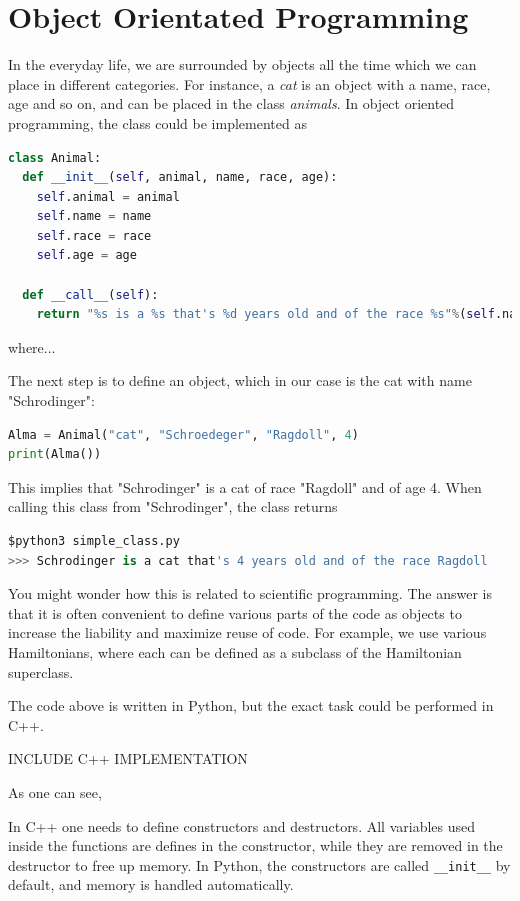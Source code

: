 \section{Object Orientated Programming}
In the everyday life, we are surrounded by objects all the time which we can place in different categories. For instance, a \textit{cat} is an object with a name, race, age and so on, and can be placed in the class \textit{animals}. In object oriented programming, the class could be implemented as

\lstset{basicstyle=\scriptsize}
\begin{lstlisting}[language=python]
class Animal:
  def __init__(self, animal, name, race, age):
    self.animal = animal
    self.name = name
    self.race = race
    self.age = age

  def __call__(self):
    return "%s is a %s that's %d years old and of the race %s"%(self.name, self.animal, self.age, self.race)
\end{lstlisting}
where...

The next step is to define an object, which in our case is the cat with name "Schrodinger":

\lstset{basicstyle=\scriptsize}
\begin{lstlisting}[language=python]
Alma = Animal("cat", "Schroedeger", "Ragdoll", 4)
print(Alma())
\end{lstlisting}
This implies that "Schrodinger" is a cat of race "Ragdoll" and of age 4. When calling this class from "Schrodinger", the class returns

\lstset{basicstyle=\scriptsize}
\begin{lstlisting}[language=python]
$python3 simple_class.py
>>> Schrodinger is a cat that's 4 years old and of the race Ragdoll
\end{lstlisting}

You might wonder how this is related to scientific programming. The answer is that it is often convenient to define various parts of the code as objects to increase the liability and maximize reuse of code. For example, we use various Hamiltonians, where each can be defined as a subclass of the Hamiltonian superclass. 

The code above is written in Python, but the exact task could be performed in C++. 

INCLUDE C++ IMPLEMENTATION

As one can see, 

In C++ one needs to define constructors and destructors. All variables used inside the functions are defines in the constructor, while they are removed in the destructor to free up memory.  In Python, the constructors are called \texttt{\_\_init\_\_} by default, and memory is handled automatically.

